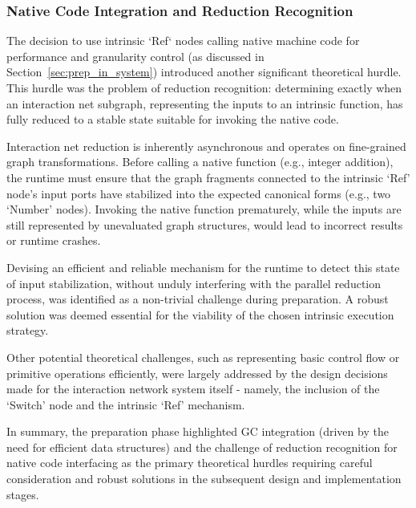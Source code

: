 \subsubsection{Native Code Integration and Reduction Recognition}

The decision to use intrinsic `Ref` nodes calling native machine code for performance and granularity control (as discussed in Section~\ref{sec:prep_in_system}) introduced another significant theoretical hurdle. This hurdle was the problem of reduction recognition: determining exactly when an interaction net subgraph, representing the inputs to an intrinsic function, has fully reduced to a stable state suitable for invoking the native code.

Interaction net reduction is inherently asynchronous and operates on fine-grained graph transformations. Before calling a native function (e.g., integer addition), the runtime must ensure that the graph fragments connected to the intrinsic `Ref' node's input ports have stabilized into the expected canonical forms (e.g., two `Number' nodes). Invoking the native function prematurely, while the inputs are still represented by unevaluated graph structures, would lead to incorrect results or runtime crashes. 

Devising an efficient and reliable mechanism for the runtime to detect this state of input stabilization, without unduly interfering with the parallel reduction process, was identified as a non-trivial challenge during preparation. A robust solution was deemed essential for the viability of the chosen intrinsic execution strategy.

Other potential theoretical challenges, such as representing basic control flow or primitive operations efficiently, were largely addressed by the design decisions made for the interaction network system itself - namely, the inclusion of the `Switch' node and the intrinsic `Ref' mechanism.

In summary, the preparation phase highlighted GC integration (driven by the need for efficient data structures) and the challenge of reduction recognition for native code interfacing as the primary theoretical hurdles requiring careful consideration and robust solutions in the subsequent design and implementation stages.


